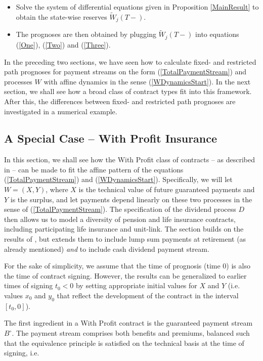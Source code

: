 \documentclass{article}
\newcommand{\1}[1]{\mathbbm{1}_{\left\lbrace #1 \right\rbrace}}
\theoremstyle{break}
\theoremstyle{remark}
\numberwithin{equation}{section}
\begin{document}
\begin{itemize}
	\item Solve the system of differential equations given in Proposition \ref{MainResult} to obtain the state-wise reserves $\tilde{W}_j(T-)$.
	\item The prognoses are then obtained by plugging $\tilde{W}_j(T-)$ into equations (\ref{One}), (\ref{Two}) and (\ref{Three}).
\end{itemize}



In the preceding two sections, we have seen how to calculate fixed- and restricted path prognoses for payment streams on the form (\ref{TotalPaymentStream}) and processes $W$ with affine dynamics in the sense (\ref{WDynamicsStart}). In the next section, we shall see how a broad class of contract types fit into this framework. After this, the differences between fixed- and restricted path prognoses are investigated in a numerical example.

\newpage
\subsection{A Special Case -- With Profit Insurance} \label{WithProfit}

In this section, we shall see how the With Profit class of contracts -- as described in \cite{Liv2Bog} -- can be made to fit the affine pattern of the equations (\ref{TotalPaymentStream}) and (\ref{WDynamicsStart}). Specifically, we will let $W=(X,Y)$, where $X$ is the technical value of future guaranteed payments and $Y$ is the surplus, and let payments depend linearly on these two processes in the sense of (\ref{TotalPaymentStream}). The specification of the dividend process $D$ then allows us to model a diversity of pension and life insurance contracts, including participating life insurance and unit-link. The section builds on the results of \cite{Lollike}, but extends them to include lump sum payments at retirement (as already mentioned) \textit{and} to include cash dividend payment stream.

For the sake of simplicity, we assume that the time of prognosis (time 0) is also the time of contract signing. However, the results can be generalized to earlier times of signing $t_0<0$ by setting appropriate initial values for $X$ and $Y$ (i.e. values $x_0$ and $y_0$ that reflect the development of the contract in the interval $[t_0,0]$).

The first ingredient in a With Profit contract is the guaranteed payment stream $B^\circ$. The payment stream comprises both benefits and premiums, balanced such that the equivalence principle is satisfied on the technical basis at the time of signing, i.e.
\end{document}
